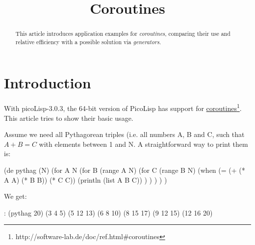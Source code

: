 \title{Coroutines}

\maketitle





% 


\begin{abstract}
This article introduces application examples for \emph{coroutines},
comparing their use and relative efficiency with a possible solution
via \emph{generators}.     
\end{abstract}

\section{Introduction}
\label{sec:coroutines-introduction}

With picoLisp-3.0.3, the 64-bit version of PicoLisp has support for
\underline{coroutines}\footnote{http://software-lab.de/doc/ref.html\#coroutines}. This article tries
to show their basic usage.

Assume we need all Pythagorean triples (i.e. all numbers A, B and C, such that
$A + B = C$  with elements between 1 and N. A straightforward way to print
them is:
\begin{wideverbatim}
   (de pythag (N)
      (for A N
         (for B (range A N)
            (for C (range B N)
               (when (= (+ (* A A) (* B B)) (* C C))
                  (println (list A B C)) ) ) ) ) )
\end{wideverbatim}

We get:
\begin{wideverbatim}
   : (pythag 20)
   (3 4 5)
   (5 12 13)
   (6 8 10)
   (8 15 17)
   (9 12 15)
   (12 16 20)
\end{wideverbatim}

